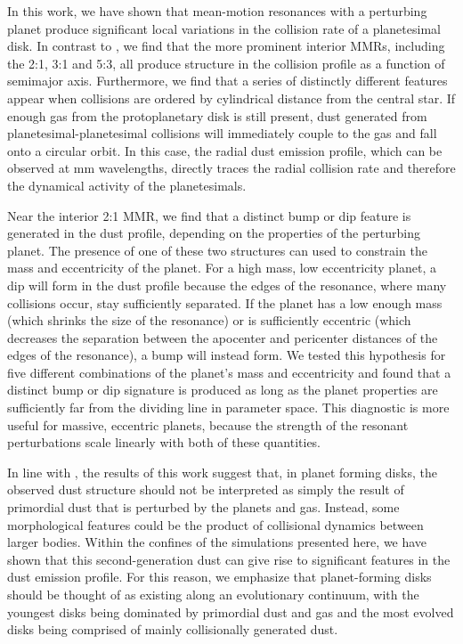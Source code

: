 \documentclass[twocolumn]{aastex63}
\begin{document}
In this work, we have shown that mean-motion resonances with a perturbing planet produce significant local variations in the collision rate of a 
planetesimal disk. In contrast to \citet{2000Icar..143...45R}, we find that the more prominent interior MMRs, including the 2:1, 3:1 and 5:3, all 
produce structure in the collision profile as a function of semimajor axis. Furthermore, we find that a series of distinctly different features appear 
when collisions are ordered by cylindrical distance from the central star. If enough gas from the protoplanetary disk is still present, dust generated 
from planetesimal-planetesimal collisions will immediately couple to the gas and fall onto a circular orbit. In this case, the radial dust emission profile, 
which can be observed at mm wavelengths, directly traces the radial collision rate and therefore the dynamical activity of the planetesimals.

Near the interior 2:1 MMR, we find that a distinct bump or dip feature is generated in the dust profile, depending on the properties of the perturbing 
planet. The presence of one of these two structures can used to constrain the mass and eccentricity of the planet. For a high mass, low eccentricity 
planet, a dip will form in the dust profile because the edges of the resonance, where many collisions occur, stay sufficiently separated. If the planet 
has a low enough mass (which shrinks the size of the resonance) or is sufficiently eccentric (which decreases the separation between the apocenter 
and pericenter distances of the edges of the resonance), a bump will instead form. We tested this hypothesis for five different combinations of the 
planet's mass and eccentricity and found that a distinct bump or dip signature is produced as long as the planet properties are sufficiently far from 
the dividing line in parameter space. This diagnostic is more useful for massive, eccentric planets, because the strength of the resonant 
perturbations scale linearly with both of these quantities.

In line with \citet{2017ApJ...850..103B}, the results of this work suggest that, in planet forming disks, the observed dust structure should not be 
interpreted as simply the result of primordial dust that is perturbed by the planets and gas. Instead, some morphological features could be the product 
of collisional dynamics between larger bodies. Within the confines of the simulations presented here, we have shown that this second-generation dust 
can give rise to significant features in the dust emission profile. For this reason, we emphasize that planet-forming disks should be thought of as 
existing along an evolutionary continuum, with the youngest disks being dominated by primordial dust and gas and the most evolved disks being 
comprised of mainly collisionally generated dust.
\end{document}
